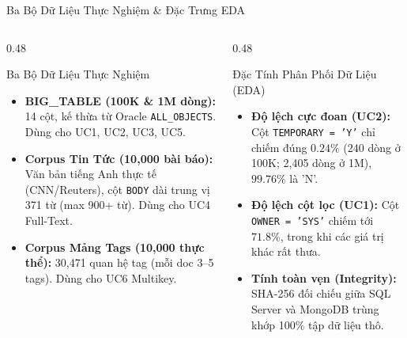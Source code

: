 \documentclass[aspectratio=169,9pt]{beamer}
\begin{document}
\begin{frame}{Ba Bộ Dữ Liệu Thực Nghiệm \& Đặc Trưng EDA}
\begin{columns}[T]
\begin{column}{0.48\textwidth}
\begin{block}{Ba Bộ Dữ Liệu Thực Nghiệm}
\footnotesize
\begin{itemize}
  \item \textbf{BIG\_TABLE (100K \& 1M dòng):} 14 cột, kế thừa từ Oracle \texttt{ALL\_OBJECTS}. Dùng cho UC1, UC2, UC3, UC5.
  \item \textbf{Corpus Tin Tức (10,000 bài báo):} Văn bản tiếng Anh thực tế (CNN/Reuters), cột \texttt{BODY} dài trung vị 371 từ (max 900+ từ). Dùng cho UC4 Full-Text.
  \item \textbf{Corpus Mảng Tags (10,000 thực thể):} 30,471 quan hệ tag (mỗi doc 3--5 tags). Dùng cho UC6 Multikey.
\end{itemize}
\end{block}
\end{column}

\begin{column}{0.48\textwidth}
\begin{exampleblock}{Đặc Tính Phân Phối Dữ Liệu (EDA)}
\footnotesize
\begin{itemize}
  \item \textbf{Độ lệch cực đoan (UC2):} Cột \texttt{TEMPORARY = 'Y'} chỉ chiếm đúng \textbf{$0.24\%$} (240 dòng ở 100K; 2,405 dòng ở 1M), $99.76\%$ là 'N'.
  \item \textbf{Độ lệch cột lọc (UC1):} Cột \texttt{OWNER = 'SYS'} chiếm tới \textbf{$71.8\%$}, trong khi các giá trị khác rất thưa.
  \item \textbf{Tính toàn vẹn (Integrity):} SHA-256 đối chiếu giữa SQL Server và MongoDB trùng khớp 100\% tập dữ liệu thô.
\end{itemize}
\end{exampleblock}
\end{column}
\end{columns}
\end{frame}
\end{document}
